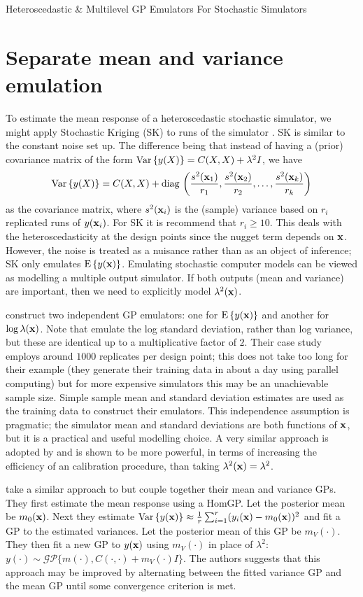 \begin{chapter}{Heteroscedastic \& Multilevel GP Emulators For Stochastic Simulators\label{Ch:Hetsml}}
\section{Separate mean and variance emulation}
To estimate the mean response of a heteroscedastic stochastic simulator, we might apply Stochastic Kriging (SK) to runs of the simulator \citep{Akenman2010}. SK is similar to the constant noise set up. The difference being that instead of having a (prior) covariance matrix of the form $\mathrm{Var}\,\{y (X)\} = C(X, X) + \lambda^2 I$, we have
\begin{equation}
	\mathrm{Var}\,\{y (X)\} = C(X, X) + \text{diag}\,\left( \frac{s^2(\mathbf{x}_1)}{r_1},\frac{s^2(\mathbf{x}_2)}{r_2}, \ldots, \frac{s^2(\mathbf{x}_k)}{r_k} \right)
\end{equation}
as the covariance matrix, where $s^2(\mathbf{x}_i)$ is the (sample) variance based on $r_i$ replicated runs of $y(\mathbf{x}_i)$. For SK it is recommend that $r_i \geq 10$. This deals with the heteroscedasticity at the design points since the nugget term depends on $\mathbf{x}$. However, the noise is treated as a nuisance rather than as an object of inference; SK only emulates $\textrm{E}\, \{ y(\mathbf{x}) \}$. Emulating stochastic computer models can be viewed as modelling a multiple output simulator. If both outputs (mean and variance) are important, then we need to explicitly model $\lambda^2(\mathbf{x})$.

\citet{Henderson09} construct two independent GP emulators: one for $\textrm{E}\, \{y(\mathbf{x}) \}$ and another for $ \log \lambda(\mathbf{x})$. Note that \citet{Henderson09} emulate the log standard deviation, rather than log variance, but these are identical up to a multiplicative factor of $2$. Their case study employs around $1000$ replicates per design point; this does not take too long for their example (they generate their training data in about a day using parallel computing) but for more expensive simulators this may be an unachievable sample size. Simple sample mean and standard deviation estimates are used as the training data to construct their emulators. This independence assumption is pragmatic; the simulator mean and standard deviations are both functions of $\mathbf{x}$, but it is a practical and useful modelling choice. A very similar approach is adopted by \citet{Andrianakis2017} and is shown to be more powerful, in terms of increasing the efficiency of an calibration procedure, than taking $\lambda^2(\mathbf{x}) = \lambda^2$.

\citet{Marrel2012} take a similar approach to \citet{Henderson09} but couple together their mean and variance GPs. They first estimate the mean response using a HomGP. Let the posterior mean be $m_0(\mathbf{x})$. Next they estimate $\mathrm{Var}\,\{ y(\mathbf{x}) \} \approx \frac{1}{r} \sum_{i=1}^r (y_i(\mathbf{x}) - m_0(\mathbf{x}))^2$ and fit a GP to the estimated variances. Let the posterior mean of this GP be $m_V(\cdot)$. They then fit a new GP to $y(\mathbf{x})$ using $m_V(\cdot)$ in place of $\lambda^2$: $y(\cdot) \sim \mathcal{GP} \{ m(\cdot), C(\cdot, \cdot) + m_V(\cdot)I \}$. The authors suggests that this approach may be improved by alternating between the fitted variance GP and the mean GP until some convergence criterion is met.


\end{chapter}

